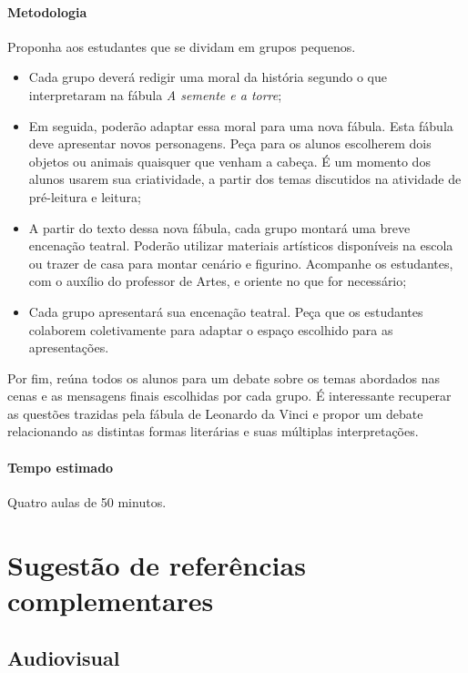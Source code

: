 \documentclass[11pt]{extarticle}
\begin{document}
\paragraph{Metodologia} Proponha aos estudantes que se dividam em grupos pequenos.

\begin{itemize}

\item Cada grupo deverá redigir uma moral da história segundo o que interpretaram na fábula \textit{A semente e a torre};

\item Em seguida, poderão adaptar essa moral para uma nova fábula. Esta fábula deve apresentar novos personagens. Peça para os alunos escolherem dois objetos ou animais quaisquer que venham a cabeça. É um momento dos alunos usarem sua criatividade, a partir dos temas discutidos na atividade de pré-leitura e leitura;

\item A partir do texto dessa nova fábula, cada grupo montará uma breve encenação teatral. Poderão utilizar materiais artísticos disponíveis na escola ou trazer de casa para montar cenário e figurino. Acompanhe os estudantes, com o auxílio do professor de Artes, e oriente no que for necessário; 

\item Cada grupo apresentará sua encenação teatral. Peça que os estudantes colaborem coletivamente para adaptar o espaço escolhido para as apresentações. 

\end{itemize}

Por fim, reúna todos os alunos para um debate sobre os temas abordados nas cenas e as mensagens finais escolhidas por cada grupo. É interessante recuperar as questões trazidas pela fábula de Leonardo da Vinci e propor um debate relacionando as distintas formas literárias e suas múltiplas interpretações.

\paragraph{Tempo estimado} Quatro aulas de 50 minutos.

\section{Sugestão de referências complementares}

\subsection{Audiovisual}
\end{document}
